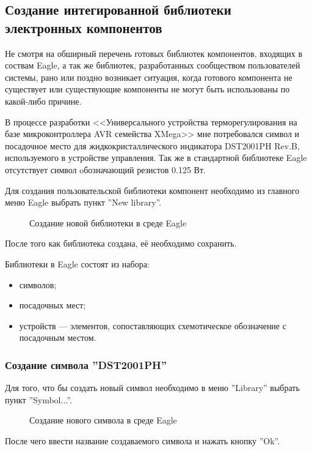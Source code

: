 \subsection{Создание интегированной библиотеки электронных компонентов}
Не смотря на обширный перечень готовых библиотек компонентов, входящих в соствам Eagle, а
так же библиотек, разработанных сообществом пользователей системы, рано или поздно возникает
ситуация, когда готового компонента не существует или существующие компоненты не могут
быть использованы по какой-либо причине.


В процессе разработки <<Универсального устройства терморегулирования на базе микроконтроллера
AVR семейства XMega>> мне потребовался символ и посадочное место для
жидкокристаллического индикатора DST2001PH Rev.B, используемого в устройстве управления.
Так же в стандартной библиотеке Eagle отсутствует символ oбозначающий резистов 0.125 Вт.

Для создания пользовательской библиотеки компонент необходимо из главного меню Eagle
выбрать пункт ''New library''.
\begin{figure}[h]
	\caption{Создание новой библиотеки в среде Eagle}
	\label{img:newLibrary}
\end{figure}
После того как библиотека создана, её необходимо сохранить.


Библиотеки в Eagle состоят из набора:
\begin{itemize}
	\item{} символов;
	\item{} посадочных мест;
	\item{} устройств --- элементов, сопоставляющих схемотическое обозначение
		с посадочным местом.
\end{itemize}

\subsubsection{Создание символа ''DST2001PH''}

Для того, что бы создать новый символ необходимо в меню ''Library'' выбрать пункт ''Symbol...''.
\begin{figure}[h]
	\caption{Создание нового символа в среде Eagle}
	\label{img:newSymbol}
\end{figure}
После чего ввести название создаваемого символа и нажать кнопку ''Ok''.

